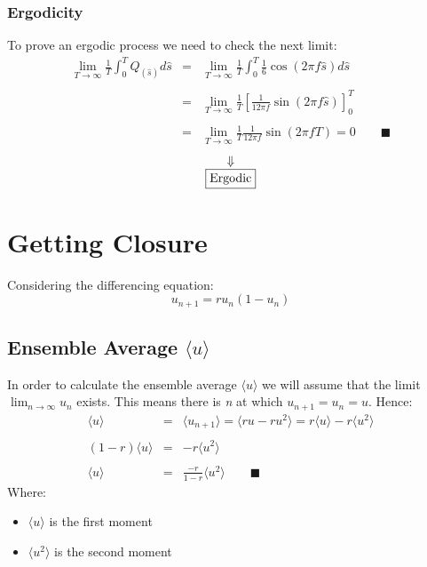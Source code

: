 \documentclass[11pt, a4paper]{article}
\begin{document}
\subsubsection{Ergodicity}
To prove an ergodic process we need to check the next limit:
\begin{equation}
    \begin{array}{rcl}
        \displaystyle \lim_{T\rightarrow\infty}\frac{1}{T}\int_{0}^{T}{Q_{\left(\hat{s}\right)}d\hat{s}} & = & \displaystyle \lim_{T\rightarrow\infty}\frac{1}{T}\int_{0}^{T}{\frac{1}{6}\cos\left(2\pi f\hat{s}\right)d\hat{s}} \\\\
        & = & \displaystyle \lim_{T\rightarrow\infty}\frac{1}{T}\left[\frac{1}{12\pi f}\sin\left(2\pi f\hat{s}\right)\right]_0^T \\\\
        & = & \displaystyle \lim_{T\rightarrow\infty}\frac{1}{T}\frac{1}{12\pi f}\sin\left(2\pi fT\right)=0\qquad\blacksquare
    \end{array}
\end{equation}
\begin{equation*}
    \begin{array}{c}
        \Downarrow \\
        \boxed{$\text{Ergodic}$}
    \end{array}
\end{equation*}

\newpage
\section{Getting Closure}
Considering the differencing equation:
\begin{equation}
    u_{n+1}=ru_n\left(1-u_n\right)
\end{equation}
\subsection{Ensemble Average $\langle u\rangle$}
In order to calculate the ensemble average $\langle u\rangle$ we will assume that the limit $\lim_{n\rightarrow\infty}{u_n}$ exists. This means there is \emph{n} at which $u_{n+1}=u_n=u$. Hence:
\begin{equation}
    \begin{array}{rcl}
        \langle u\rangle & = & \langle u_{n+1}\rangle=\langle ru-ru^2\rangle= r\langle u\rangle-r\langle u^2\rangle \\\\
        \left(1-r\right)\langle u\rangle& = & -r\langle u^2\rangle \\\\
        \langle u\rangle& = & \displaystyle\frac{-r}{1-r}\langle u^2\rangle\qquad\blacksquare
    \end{array}
\end{equation}
Where:
\begin{itemize}
    \item $\langle u\rangle$ is the first moment
    \item $\langle u^2\rangle$ is the second moment
\end{itemize}
\end{document}
